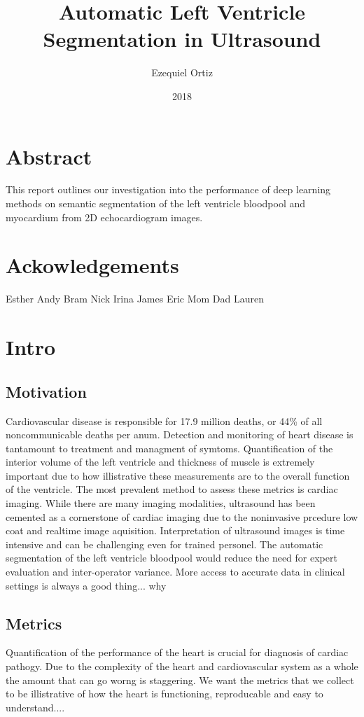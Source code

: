 \documentclass[12pt]{article}
\title{Automatic Left Ventricle Segmentation in Ultrasound}
\date{2018}
\author{Ezequiel Ortiz}
\begin{document}
\maketitle
{}
\newpage
\tableofcontents
\newpage
\doublespacing
{}

\section{Abstract}
This report outlines our investigation into the performance of deep learning methods on semantic segmentation of the left ventricle bloodpool and myocardium from 2D echocardiogram images.
\section{Ackowledgements}
Esther
Andy
Bram
Nick
Irina
James
Eric
Mom
Dad
Lauren
\section{Intro}
\subsection{Motivation}
Cardiovascular disease is responsible for 17.9 million deaths, or 44\% of all noncommunicable deaths per anum\cite{who_world_health}.
Detection and monitoring of heart disease is tantamount to treatment and managment of symtoms.%
Quantification of the interior volume of the left ventricle and thickness of muscle is extremely important due to how illistrative these measurements are to the overall function of the ventricle.\cite{ase_chamber_quant}
The most prevalent method to assess these metrics is cardiac imaging.
While there are many imaging modalities, ultrasound has been cemented as a cornerstone of cardiac imaging due to the noninvasive prcedure low coat and realtime image aquisition.
Interpretation of ultrasound images is time intensive and can be challenging even for trained personel.
The automatic segmentation of the left ventricle bloodpool %
would reduce the need for expert evaluation and inter-operator variance.%
More access to accurate data in clinical settings is always a good thing... why

\subsection{Metrics}
Quantification of the performance of the heart is crucial for diagnosis of cardiac pathogy.
Due to the complexity of the heart and cardiovascular system as a whole the amount that can go worng is staggering.
We want the metrics that we collect to be illistrative of how the heart is functioning,
reproducable
and easy to understand....%
\end{document}
